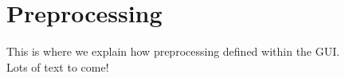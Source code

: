 
\chapter{Preprocessing}
\minitoc

This is where we explain how preprocessing defined within the GUI.\\
Lots of text to come!